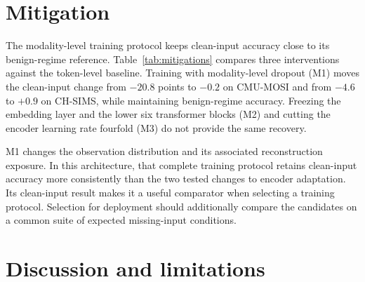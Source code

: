 \documentclass[preprint,11pt]{elsarticle}
\newcommand{\tokenlevel}{token-level}
\newcommand{\modlevel}{modality-level}
\begin{document}
\section{Mitigation}\label{sec:mitigation}

The modality-level training protocol keeps clean-input accuracy close to its
benign-regime reference. Table~\ref{tab:mitigations}
compares three interventions against the \tokenlevel{} baseline. Training with
\modlevel{} dropout (M1) moves the clean-input change from
$-20.8$ points to $-0.2$ on CMU-MOSI and from $-4.6$ to $+0.9$ on CH-SIMS, while
maintaining benign-regime accuracy. Freezing the
embedding layer and the lower six transformer blocks (M2) and cutting the
encoder learning rate fourfold (M3) do not provide the same recovery.

M1 changes the observation distribution and its associated reconstruction
exposure. In this architecture, that complete training protocol retains
clean-input accuracy more consistently than the two tested changes to encoder
adaptation. Its clean-input result makes it a useful comparator when selecting
a training protocol. Selection for deployment should additionally compare
the candidates on a common suite of expected missing-input conditions.

\begin{table}[t]
\centering
\caption{Clean-input performance under three interventions. Changing the
training protocol to \modlevel{} dropout (M1) preserves accuracy; freezing
lower layers (M2) and reducing the encoder learning rate (M3) do not.
Values are mean $\pm$ standard deviation over five baseline seeds and three
intervention seeds; changes are paired by seed.}
\label{tab:mitigations}
\small
\resizebox{\linewidth}{!}{}
\end{table}

\FloatBarrier
\section{Discussion and limitations}\label{sec:limitations}
\end{document}
